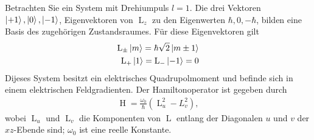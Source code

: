\documentclass[11pt,a4paper]{scrartcl}
\begin{document}
    Betrachten Sie ein System mit Drehiumpuls $l=1$. Die drei Vektoren $\ket{+1}, \ket{0}, \ket{-1}$, Eigenvektoren von $\operatorname{L}_z$ zu den Eigenwerten $\hbar, 0, -\hbar$, bilden eine Basis des zugehörigen Zustandsraumes. Für diese Eigenvektoren gilt
    \begin{align*}
        \operatorname{L}_\pm\ket{m} = \hbar \sqrt{2} \ket{m \pm 1}\\
        \operatorname{L}_+\ket{1} = \operatorname{L}_- \ket{- 1} = 0\\
    \end{align*}
    Dijeses System besitzt ein elektrisches Quadrupolmoment und befinde sich in einem elektrischen Feldgradienten. Der Hamiltonoperator ist gegeben durch
    \begin{align*}
        \operatorname{H} = \frac{\omega_0}{\hbar} (\operatorname{L}_u^2 - L_v^2),
    \end{align*}
    wobei $\operatorname{L}_u$ und $\operatorname{L}_v$ die Komponenten von $\operatorname{L}$ entlang der Diagonalen $u$ und $v$ der $xz$-Ebende sind; $\omega_0$ ist eine reelle Konstante.
\end{document}
